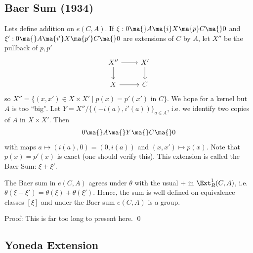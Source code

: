 \subsection{Baer Sum (1934)}

Lets define addition on $e(C,A)$. If $\xi: 0 \ma{} A \ma{i} X \ma{p} C \ma{} 0$ and $\xi': 0 \ma{} A \ma{i'} X \ma{p'} C \ma{} 0$ are extensions of $C$ by $A$, let $X''$ be the pullback of $p,p'$
\[
\begin{tikzcd}
X'' \arrow{r} \arrow{d} & X' \arrow{d} \\
X \arrow{r} & C
\end{tikzcd}
\]
so $X''=\{(x,x') \in X \times X' \;|\; p(x)=p'(x') \text{ in }C\}$. We hope for a kernel but $A$ is too ``big". Let $Y=X''/\{(-i(a),i'(a))\}_{a \in A}$, i.e. we identify two copies of $A$ in $X \times X'$. Then 
\[
0 \ma{} A \ma{} Y \ma{} C \ma{} 0
\]
with maps $a \mapsto (i(a),0)=(0,i(a))$ and $(x,x') \mapsto p(x)$. Note that $p(x)=p'(x)$ is exact (one should verify this). This extension is called the Baer Sum: $\xi+\xi'$. 

\begin{thm}
The Baer sum in $e(C,A)$ agrees under $\theta$ with the usual $+$ in $\Ext_R^1(C,A)$, i.e. $\theta(\xi+\xi')=\theta(\xi)+\theta(\xi')$. Hence, the sum is well defined on equivalence classes $[\xi]$ and under the Baer sum $e(C,A)$ is a group. 
\end{thm}

\noindent Proof: This is far too long to present here. \qed \\

\subsection{Yoneda Extension}

